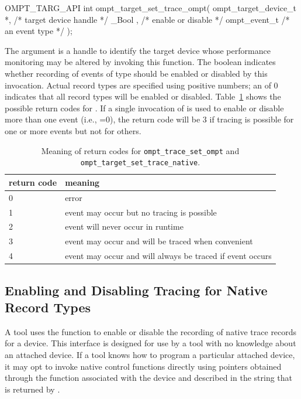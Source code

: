 \documentclass{article}
\begin{document}
\begin{boxedcode}
OMPT\_TARG\_API int ompt\_target\_set\_trace\_ompt(
  ompt\_target\_device\_t *,                     /* target device handle       */
  \_Bool ,                                     /* enable or disable          */
  ompt\_event\_t                                 /* an event type              */
);
\end{boxedcode}
The argument  is a handle to identify the target device whose performance monitoring may be altered by invoking this function. 
The boolean  indicates whether recording of events of type  should be enabled or disabled by this invocation.
Actual record types are specified using positive numbers; an  of 0 indicates that all record types will be enabled or disabled.
Table~\ref{table:record_set} shows the possible return codes for . 
If a single invocation of  is used to enable or disable more than one event (i.e., =0), the return code will be 3 if tracing is possible for one or more events but not for others.
\begin{table}
\centering
\begin{tabular}{|l|l|}
\hline
return code & meaning \\\hline
0 & error\\\hline
1 & event may occur but no tracing is possible\\\hline
2 & event will never occur in runtime\\\hline
3 & event may occur and will be traced  when convenient\\\hline
4 & event may occur and will always be traced if event occurs\\\hline
\end{tabular}
\caption{Meaning of return codes for {\tt ompt\_trace\_set\_ompt} and {\tt ompt\_target\_set\_trace\_native}.}
\label{table:record_set}
\end{table}




\subsection{Enabling and Disabling Tracing for Native Record Types}
\label{sec:trace-event-native}
A tool uses the function  to enable or disable the recording of native trace records for a device. This interface is designed for use by a tool with no 
knowledge about an attached device. If a tool knows how to program a particular attached device, it may opt to invoke native control functions directly using pointers obtained through the  function associated with the device and described in the  string that is returned by .
\end{document}
